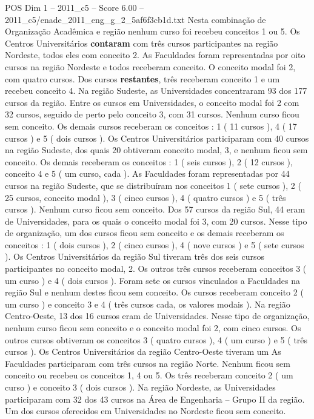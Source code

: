 \begin{textsample}{POS Dim 1 – 2011\_c5 – Score 6.00 – 2011\_c5/enade\_2011\_eng\_g\_2\_5af6f3cb1d.txt}
Nesta combinação de Organização Acadêmica e região nenhum curso foi recebeu conceitos 1 ou 5.
Os Centros Universitários \textbf{contaram} com três cursos participantes na região Nordeste, todos eles com conceito 2.
As Faculdades foram representadas por oito cursos na região Nordeste e todos receberam conceito.
O conceito modal foi 2, com quatro cursos.
Dos cursos \textbf{restantes}, três receberam conceito 1 e um recebeu conceito 4.
Na região Sudeste, as Universidades concentraram 93 dos 177 cursos da região.
Entre os cursos em Universidades, o conceito modal foi 2 com 32 cursos, seguido de perto pelo conceito 3, com 31 cursos.
Nenhum curso ficou sem conceito.
Os demais cursos receberam os conceitos : 1 ( 11 cursos ), 4 ( 17 cursos ) e 5 ( dois cursos ).
Os Centros Universitários participaram com 40 cursos na região Sudeste, dos quais 20 obtiveram conceito modal, 3, e nenhum ficou sem conceito.
Os demais receberam os conceitos : 1 ( seis cursos ), 2 ( 12 cursos ), conceito 4 e 5 ( um curso, cada ).
As Faculdades foram representadas por 44 cursos na região Sudeste, que se distribuíram nos conceitos 1 ( sete cursos ), 2 ( 25 cursos, conceito modal ), 3 ( cinco cursos ), 4 ( quatro cursos ) e 5 ( três cursos ).
Nenhum curso ficou sem conceito.
Dos 57 cursos da região Sul, 44 eram de Universidades, para os quais o conceito modal foi 3, com 20 cursos.
Nesse tipo de organização, um dos cursos ficou sem conceito e os demais receberam os conceitos : 1 ( dois cursos ), 2 ( cinco cursos ), 4 ( nove cursos ) e 5 ( sete cursos ).
Os Centros Universitários da região Sul tiveram três dos seis cursos participantes no conceito modal, 2.
Os outros três cursos receberam conceitos 3 ( um curso ) e 4 ( dois cursos ).
Foram sete os cursos vinculados a Faculdades na região Sul e nenhum destes ficou sem conceito.
Os cursos receberam conceito 2 ( um curso ) e conceito 3 e 4 ( três cursos cada, os valores modais ).
Na região Centro-Oeste, 13 dos 16 cursos eram de Universidades.
Nesse tipo de organização, nenhum curso ficou sem conceito e o conceito modal foi 2, com cinco cursos.
Os outros cursos obtiveram os conceitos 3 ( quatro cursos ), 4 ( um curso ) e 5 ( três cursos ).
Os Centros Universitários da região Centro-Oeste tiveram um As Faculdades participaram com três cursos na região Norte.
Nenhum ficou sem conceito ou recebeu os conceitos 1, 4 ou 5.
Os três receberam conceito 2 ( um curso ) e conceito 3 ( dois cursos ).
Na região Nordeste, as Universidades participaram com 32 dos 43 cursos na Área de Engenharia – Grupo II da região.
Um dos cursos oferecidos em Universidades no Nordeste ficou sem conceito.

\end{textsample}
